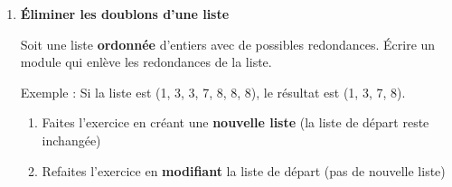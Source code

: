 	\liststyleExercice
	\setcounter{saveenum}{\value{enumi}}
	\begin{enumerate}
	\setcounter{enumi}{\value{saveenum}}
		\item {\sffamily\bfseries
		Éliminer les doublons d'une liste}
		
			Soit une liste \textbf{ordonnée} 
			d'entiers avec de possibles redondances. Écrire un
			module qui enlève les redondances de la liste.
					
			Exemple : Si la liste est (1, 3, 3, 7, 8, 8, 8),
			le résultat est (1, 3, 7, 8).

			\begin{enumerate}
				\item 
					Faites l'exercice en créant une \textbf{nouvelle
					liste} (la liste de départ reste inchangée)
				\item 
					Refaites l'exercice en \textbf{modifiant}
					la liste de départ (pas de nouvelle liste)
			\end{enumerate}
	\end{enumerate}
	
